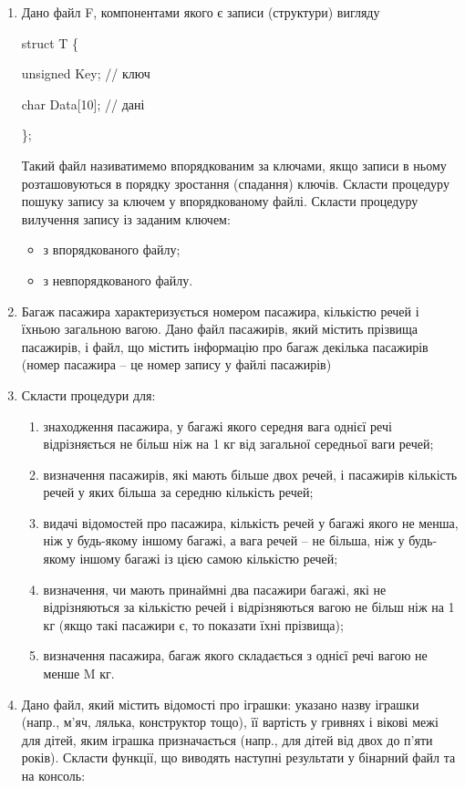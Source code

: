 \documentclass[]{article}
\makeatletter
\newcommand{\xslalph}[1]{\expandafter\@xslalph\csname c@#1\endcsname}
\newcommand{\@xslalph}[1]{%
    \ifcase#1\or а\or б\or в\or г\or д\or e\or є\or ж\or з\or i%
    \or й\or к\or л\or м\or н\or о\or п\or р\or с\or т%
    \or у\or ф\or х\or ц\or ч\or ш\or ю\or я\or аа\or бб\or вв%
    \else\@ctrerr\fi%
}
\makeatother
\begin{document}
\begin{enumerate}
\begin{enumerate}[label=\xslalph*)]
\begin{enumerate}
\begin{enumerate}[label=\xslalph*)]
\begin{enumerate}
\item
  Дано файл F, компонентами якого є записи (структури) вигляду

struct T \{

unsigned Key; // ключ

char Data{[}10{]}; // дані

\};

Такий файл називатимемо впорядкованим за ключами, якщо записи в ньому
розташовуються в порядку зростання (спадання) ключів. Скласти процедуру
пошуку запису за ключем у впорядкованому файлі. Скласти процедуру
вилучення запису із заданим ключем:
\begin{itemize}
\item з впорядкованого файлу;
\item з невпорядкованого файлу.
\end{itemize}

\item
  Багаж пасажира характеризується номером пасажира, кількістю речей і
  їхньою загальною вагою. Дано файл пасажирів, який містить прізвища
  пасажирів, і файл, що містить інформацію про багаж декілька пасажирів
  (номер пасажира -- це номер запису у файлі пасажирів)
\item
  Скласти процедури для:
  \begin{enumerate}[label=\xslalph*)]
\item
знаходження пасажира, у багажі якого середня вага однієї речі
відрізняється не більш ніж на 1 кг від загальної середньої ваги речей;
\item
визначення пасажирів, які мають більше двох речей, і пасажирів
кількість речей у яких більша за середню кількість речей;
\item
видачі відомостей про пасажира, кількість речей у багажі якого не
менша, ніж у будь-якому іншому багажі, а вага речей -- не більша, ніж у
будь-якому іншому багажі із цією самою кількістю речей;
\item
визначення, чи мають принаймні два пасажири багажі, які не
відрізняються за кількістю речей і відрізняються вагою не більш ніж на 1
кг (якщо такі пасажири є, то показати їхні прізвища);
\item визначення пасажира, багаж якого складається з однієї речі вагою не
менше M кг.
  \end{enumerate}

\item
  Дано файл, який містить відомості про іграшки: указано назву іграшки
  (напр., м'яч, лялька, конструктор тощо), її вартість у гривнях і
  вікові межі для дітей, яким іграшка призначається (напр., для дітей
  від двох до п'яти років). Скласти функції, що виводять наступні результати 
  у бінарний файл та на консоль:


\end{enumerate}
\end{enumerate}
\end{enumerate}
\end{enumerate}
\end{enumerate}
\end{document}
